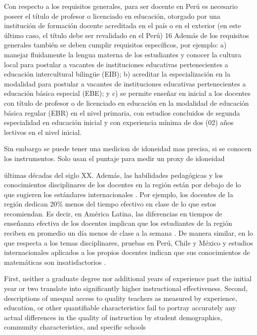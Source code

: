 Con respecto a los requisitos generales, para ser docente en Perú es necesario poseer el título de profesor o licenciado en educación, otorgado por una institución de formación docente acreditada en el país o en el exterior (en este último caso, el título debe ser revalidado en el Perú) 16 Además de los requisitos generales también se deben cumplir requisitos específicos, por ejemplo: a) manejar fluidamente la lengua materna de los estudiantes y conocer la cultura local para postular a vacantes de instituciones educativas pertenecientes a educación intercultural bilingüe (EIB); b) acreditar la especialización en la modalidad para postular a vacantes de instituciones educativas pertenecientes a educación básica especial (EBE); y c) se permite enseñar en inicial a los docentes con título de profesor o de licenciado en educación en la modalidad de educación básica regular (EBR) en el nivel primaria, con estudios concluidos de segunda especialidad en educación inicial y con experiencia mínima de dos (02) años lectivos en el nivel inicial.

Sin embargo se puede tener una medicion de idoneidad mas precisa, si se conocen los instrumentos. Solo usan el puntaje para medir un proxy de idoneidad


últimas décadas del siglo XX. Además, las habilidades pedagógicas y los conocimientos disciplinares de los docentes en la región están por debajo de lo que sugieren los estándares internacionales \citep{Hincapie_et_al_2020}. Por ejemplo, los docentes de la región dedican 20\% menos del tiempo efectivo en clase de lo que estos recomiendan. Es decir, en América Latina, las diferencias en tiempos de enseñanza efectiva de los docentes implican que los estudiantes de la región reciben en promedio un día menos de clase a la semana \citep{Bruns_et_al_2015}. De manera similar, en lo que respecta a los temas disciplinares, pruebas en Perú, Chile y México y estudios internacionales aplicados a los propios docentes indican que sus conocimientos de matemáticas son insatisfactorios \citep{Elacqua_et_al_2018}.


First, neither a graduate degree nor additional years of experience past the initial year or two translate into significantly higher instructional effectiveness. Second, descriptions of unequal access to quality teachers as measured by experience, education, or other quantifiable characteristics fail to portray accurately any actual differences in the quality of instruction by student demographics, community characteristics, and specific schools \citep{Hanushek_et_al_2012}


